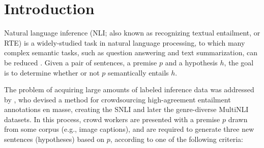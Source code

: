 \section{Introduction}

Natural language inference (NLI; also known as recognizing textual entailment, or RTE)
is a widely-studied task in natural language processing, to which many complex semantic tasks, such as question answering and text summarization, can be reduced \cite{Dagan:2006}.
Given a pair of sentences, a premise $p$ and a hypothesis $h$, the goal is to determine whether or not $p$ semantically entails $h$.

The problem of acquiring large amounts of labeled inference data was addressed by \citet{Bowman:2015}, who devised a method for crowdsourcing high-agreement entailment annotations en masse, creating the SNLI and later the genre-diverse MultiNLI \cite{Williams:2017} datasets.
In this process, crowd workers are presented with a premise $p$ drawn from some corpus (e.g., image captions), and are required to generate three new sentences (hypotheses) based on $p$, according to one of the following criteria:
% 


